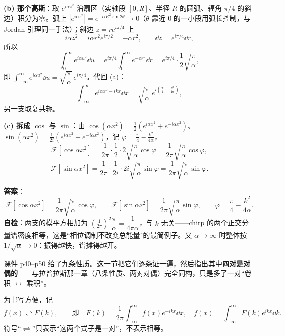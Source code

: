 \documentclass[11pt]{ctexart}
\begin{document}
\textbf{(b) 那个高斯}：取 $e^{i\alpha z^2}$ 沿扇区（实轴段 $[0,R]$、半径 $R$ 的圆弧、辐角 $\pi/4$ 的斜边）积分为零。弧上 $\left|e^{i\alpha z^2}\right|=e^{-\alpha R^2\sin2\theta}\to0$（$\theta$ 靠近 $0$ 的一小段用弧长控制，与 Jordan 引理同一手法）；斜边 $z=re^{i\pi/4}$ 上
\[ i\alpha z^2=i\alpha r^2e^{i\pi/2}=-\alpha r^2,\qquad \dd z=e^{i\pi/4}\dd r ,\]
所以
\[ \int_0^{\infty}e^{i\alpha u^2}\dd u=e^{i\pi/4}\int_0^{\infty}e^{-\alpha r^2}\dd r=e^{i\pi/4}\cdot\frac12\sqrt{\frac{\pi}{\alpha}} ,\]
即 $\int_{-\infty}^{\infty}e^{i\alpha u^2}\dd u=\sqrt{\dfrac{\pi}{\alpha}}\,e^{i\pi/4}$。代回 (a)：
\[ \int_{-\infty}^{\infty}e^{i\alpha x^2-ikx}\dd x=\sqrt{\frac{\pi}{\alpha}}\,e^{i\left(\frac{\pi}{4}-\frac{k^2}{4\alpha}\right)} ,\]
另一支取复共轭。

\textbf{(c) 拆成 $\cos$ 与 $\sin$}：由 $\cos(\alpha x^2)=\frac12\left(e^{i\alpha x^2}+e^{-i\alpha x^2}\right)$、$\sin(\alpha x^2)=\frac{1}{2i}\left(e^{i\alpha x^2}-e^{-i\alpha x^2}\right)$，记 $\varphi=\frac{\pi}{4}-\frac{k^2}{4\alpha}$，
\[
\mathcal{F}[\cos\alpha x^2]=\frac{1}{2\pi}\cdot\frac12\cdot2\sqrt{\frac{\pi}{\alpha}}\cos\varphi=\frac{1}{2\pi}\sqrt{\frac{\pi}{\alpha}}\cos\varphi ,
\]
\[
\mathcal{F}[\sin\alpha x^2]=\frac{1}{2\pi}\cdot\frac{1}{2i}\cdot2i\sqrt{\frac{\pi}{\alpha}}\sin\varphi=\frac{1}{2\pi}\sqrt{\frac{\pi}{\alpha}}\sin\varphi .
\]

\textbf{答案}：
\[
\mathcal{F}\left[\cos\alpha x^2\right]=\frac{1}{2\pi}\sqrt{\frac{\pi}{\alpha}}\cos\varphi,\qquad
\mathcal{F}\left[\sin\alpha x^2\right]=\frac{1}{2\pi}\sqrt{\frac{\pi}{\alpha}}\sin\varphi,\qquad \varphi=\frac{\pi}{4}-\frac{k^2}{4\alpha} .
\]
\textbf{自检}：两支的模平方相加为 $\left(\frac{1}{2\pi}\right)^2\dfrac{\pi}{\alpha}=\dfrac{1}{4\pi\alpha}$，与 $k$ 无关——chirp 的两个正交分量谱密度相等，这是“相位调制不改变总能量”的最简例子。又 $\alpha\to\infty$ 时整体按 $1/\sqrt{\alpha}\to0$：振得越快，谱摊得越开。


课件 p40--p50 给了九条性质。这一节把它们逐条证一遍，然后指出其中\textbf{四对是对偶的}——与拉普拉斯那一章（八条性质、两对对偶）完全同构，只是多了一对“卷积 $\leftrightarrow$ 乘积”。


为书写方便，记
\[ f(x)\rightleftharpoons F(k),\qquad\text{即}\quad F(k)=\frac{1}{2\pi}\int_{-\infty}^{\infty}f(x)e^{-ikx}\dd x,\quad f(x)=\int_{-\infty}^{\infty}F(k)e^{ikx}\dd k .\]
符号“$\rightleftharpoons$”只表示“这两个式子是一对”，不表示相等。
\end{document}
